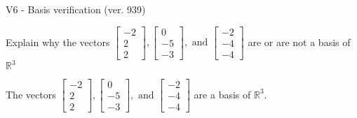 \begin{exercise}
  \begin{exerciseTitle}V6 - Basis verification (ver. 939)\end{exerciseTitle}
  \begin{exerciseStatement}
    Explain why the vectors \(\left[\begin{array}{r}
-2 \\
2 \\
2
\end{array}\right] , \left[\begin{array}{r}
0 \\
-5 \\
-3
\end{array}\right] , \text{ and } \left[\begin{array}{r}
-2 \\
-4 \\
-4
\end{array}\right]\) are or are not a basis of \(\mathbb{R}^3\)	


  \end{exerciseStatement}
  \begin{exerciseAnswer}
   The vectors \(\left[\begin{array}{r}
-2 \\
2 \\
2
\end{array}\right] , \left[\begin{array}{r}
0 \\
-5 \\
-3
\end{array}\right] , \text{ and } \left[\begin{array}{r}
-2 \\
-4 \\
-4
\end{array}\right]\) 
  	 are  a basis of \(\mathbb{R}^3\).
  


  \end{exerciseAnswer}
\end{exercise}